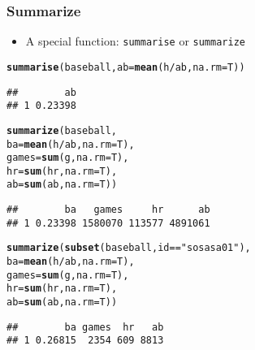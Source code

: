 \documentclass{beamer}\usepackage[]{graphicx}\usepackage[]{color}
\makeatletter
\newcommand{\hlstr}[1]{\textcolor[rgb]{0.192,0.494,0.8}{#1}}%
\newcommand{\hlopt}[1]{\textcolor[rgb]{0,0,0}{#1}}%
\newcommand{\hlstd}[1]{\textcolor[rgb]{0.345,0.345,0.345}{#1}}%
\newcommand{\hlkwc}[1]{\textcolor[rgb]{0.333,0.667,0.333}{#1}}%
\newcommand{\hlkwd}[1]{\textcolor[rgb]{0.737,0.353,0.396}{\textbf{#1}}}%
\newenvironment{kframe}{%
 \def\at@end@of@kframe{}%
 \ifinner\ifhmode%
  \def\at@end@of@kframe{\end{minipage}}%
  \begin{minipage}{\columnwidth}%
 \fi\fi%
 \def\FrameCommand##1{\hskip\@totalleftmargin \hskip-\fboxsep
 \colorbox{shadecolor}{##1}\hskip-\fboxsep
     \hskip-\linewidth \hskip-\@totalleftmargin \hskip\columnwidth}%
 \MakeFramed {\advance\hsize-\width
   \@totalleftmargin\z@ \linewidth\hsize
   \@setminipage}}%
 {\par\unskip\endMakeFramed%
 \at@end@of@kframe}
\newenvironment{knitrout}{}{} %
\makeatother
\begin{document}
\begin{frame}[fragile]
\frametitle{Summarize}
\begin{itemize}
\item A special function: \texttt{summarise} or \texttt{summarize}
\end{itemize}
\begin{knitrout}\scriptsize
{}\color{fgcolor}\begin{kframe}
\begin{alltt}
\hlkwd{summarise}\hlstd{(baseball,} \hlkwc{ab}\hlstd{=}\hlkwd{mean}\hlstd{(h}\hlopt{/}\hlstd{ab,} \hlkwc{na.rm}\hlstd{=T))}
\end{alltt}
\begin{verbatim}
##        ab
## 1 0.23398
\end{verbatim}
\begin{alltt}
\hlkwd{summarize}\hlstd{(baseball,}
          \hlkwc{ba} \hlstd{=} \hlkwd{mean}\hlstd{(h}\hlopt{/}\hlstd{ab,} \hlkwc{na.rm}\hlstd{=T),}
          \hlkwc{games} \hlstd{=} \hlkwd{sum}\hlstd{(g,} \hlkwc{na.rm}\hlstd{=T),}
          \hlkwc{hr} \hlstd{=} \hlkwd{sum}\hlstd{(hr,} \hlkwc{na.rm}\hlstd{=T),}
          \hlkwc{ab} \hlstd{=} \hlkwd{sum}\hlstd{(ab,} \hlkwc{na.rm}\hlstd{=T))}
\end{alltt}
\begin{verbatim}
##        ba   games     hr      ab
## 1 0.23398 1580070 113577 4891061
\end{verbatim}
\begin{alltt}
\hlkwd{summarize}\hlstd{(}\hlkwd{subset}\hlstd{(baseball, id}\hlopt{==}\hlstr{"sosasa01"}\hlstd{),}
          \hlkwc{ba} \hlstd{=} \hlkwd{mean}\hlstd{(h}\hlopt{/}\hlstd{ab,} \hlkwc{na.rm}\hlstd{=T),}
          \hlkwc{games} \hlstd{=} \hlkwd{sum}\hlstd{(g,} \hlkwc{na.rm}\hlstd{=T),}
          \hlkwc{hr} \hlstd{=} \hlkwd{sum}\hlstd{(hr,} \hlkwc{na.rm}\hlstd{=T),}
          \hlkwc{ab} \hlstd{=} \hlkwd{sum}\hlstd{(ab,} \hlkwc{na.rm}\hlstd{=T))}
\end{alltt}
\begin{verbatim}
##        ba games  hr   ab
## 1 0.26815  2354 609 8813
\end{verbatim}
\end{kframe}
\end{knitrout}
\end{frame}
\end{document}
